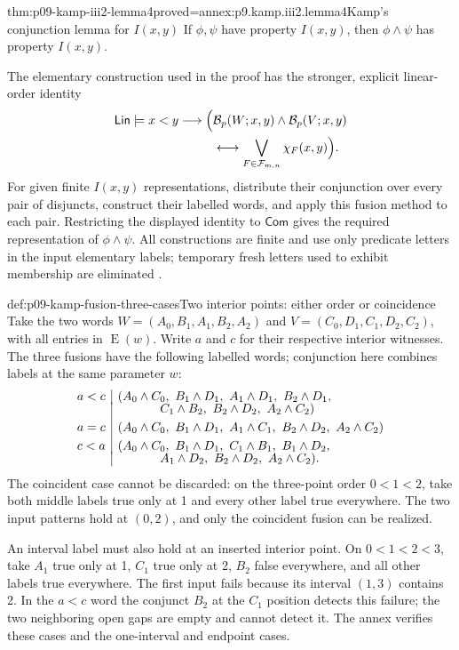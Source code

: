 \begin{hblemma}{thm:p09-kamp-iii2-lemma4}{proved=annex:p9.kamp.iii2.lemma4}{Kamp's conjunction lemma for \(I(x,y)\)}
If \(\phi,\psi\) have property \(I(x,y)\), then \(\phi\land\psi\)
has property \(I(x,y)\).

The elementary construction used in the proof has the stronger, explicit
linear-order identity
\[
\begin{split}
 \mathsf{Lin}\models x<y\longrightarrow
 \Bigl(&\mathcal B_p(W;x,y)\land\mathcal B_p(V;x,y)\\
       &\longleftrightarrow
                   \bigvee_{F\in\mathcal F_{m,n}}\chi_F(x,y)\Bigr).
\end{split}
\]
For given finite \(I(x,y)\) representations, distribute their conjunction
over every pair of disjuncts, construct their labelled words, and apply this
fusion method to each pair. Restricting the displayed identity to
\(\mathsf{Com}\) gives the required representation of
\(\phi\land\psi\). All constructions are finite and use only
predicate letters in the input elementary labels; temporary fresh letters
used to exhibit membership are eliminated
\cite[ch.~III, lemma~4, pp.~73--78]{Kamp1968}.
\end{hblemma}

\begin{hbexample}{def:p09-kamp-fusion-three-cases}{Two interior points: either order or coincidence}
Take the two words
\(W=(A_0,B_1,A_1,B_2,A_2)\) and
\(V=(C_0,D_1,C_1,D_2,C_2)\), with all entries in
\(\operatorname{E}(w)\). Write \(a\) and \(c\) for their respective
interior witnesses. The three fusions have the following labelled words;
conjunction here combines labels at the same parameter \(w\):
\[
\begin{array}{c|l}
 a<c & (A_0\land C_0,\ B_1\land D_1,\ A_1\land D_1,\
           B_2\land D_1,\\[-2pt]
     & \hspace{12mm} C_1\land B_2,\ B_2\land D_2,\ A_2\land C_2)\\[3pt]
 a=c & (A_0\land C_0,\ B_1\land D_1,\ A_1\land C_1,\
           B_2\land D_2,\ A_2\land C_2)\\[3pt]
 c<a & (A_0\land C_0,\ B_1\land D_1,\ C_1\land B_1,\
           B_1\land D_2,\\[-2pt]
     & \hspace{12mm} A_1\land D_2,\ B_2\land D_2,\ A_2\land C_2).
\end{array}
\]
The coincident case cannot be discarded: on the three-point order
\(0<1<2\), take both middle labels true only at 1 and every other
label true everywhere. The two input patterns hold at \((0,2)\), and
only the coincident fusion can be realized.

An interval label must also hold at an inserted interior point. On
\(0<1<2<3\), take \(A_1\) true only at 1, \(C_1\) true only at 2,
\(B_2\) false everywhere, and all other labels true everywhere. The
first input fails because its interval \((1,3)\) contains 2. In the
\(a<c\) word the conjunct \(B_2\) at the \(C_1\) position detects
this failure; the two neighboring open gaps are empty and cannot detect it.
The annex verifies these cases and the one-interval and endpoint cases.
\end{hbexample}

